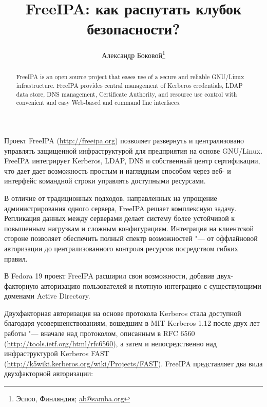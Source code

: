 \documentclass[10pt, a5paper]{article}
\begin{document}
\title{FreeIPA: как распутать клубок безопасности?}%

\author{Александр Боковой\footnote{Эспоо, Финляндия; \url{ab@samba.org}}}
\maketitle

\begin{abstract}
FreeIPA is an open source project that eases use of a secure and reliable GNU/Linux infrastructure. FreeIPA provides central \linebreak management of Kerberos credentials, LDAP data store, DNS management, Certificate Authority, and resource use control with  convenient and easy Web-based and command line interfaces.
\end{abstract}

Проект FreeIPA (\url{http://freeipa.org}) позволяет развернуть и централизовано управлять защищенной инфраструктурой для предприятия на основе GNU/Linux. FreeIPA интегрирует Kerberos, \linebreak LDAP, DNS и собственный центр сертификации, что дает дает возможность  простым и наглядным способом через веб- и интерфейс командной строки управлять доступными ресурсами.

В отличие от традиционных подходов, направленных на упрощение администрирования одного сервера, FreeIPA решает комплексную задачу. Репликация данных между серверами делает систему более устойчивой к повышенным нагрузкам и сложным конфигурациям. Интеграция на клиентской стороне позволяет обеспечить полный спектр возможностей "--- от оффлайновой авторизации до централизованного контроля ресурсов посредством гибких правил.

В Fedora 19 проект FreeIPA расширил свои возможности,  добавив двух-факторную авторизацию пользователей и плотную интеграцию с существующими доменами Active Directory.

Двухфакторная авторизация на основе протокола Kerberos стала доступной благодаря усовершенствованиям, вошедшим в MIT Kerberos 1.12
после двух лет работы "--- вначале над протоколом, описанным в RFC 6560 (\url{http://tools.ietf.org/html/rfc6560}), а затем и непосредственно над инфраструктурой Kerberos FAST \linebreak (\url{http://k5wiki.kerberos.org/wiki/Projects/FAST}). FreeIPA представляет два вида двухфакторной авторизации:
\end{document}
